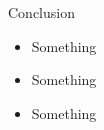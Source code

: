 \begin{frame}{Conclusion}
	\begin{itemize}
		\item Something
		\item Something
		\item Something
	\end{itemize}

\end{frame}